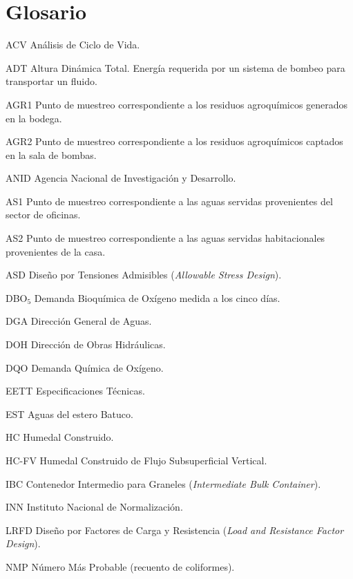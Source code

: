 \chapter*{Glosario}

\begin{glosario}
  \item[ACV] Análisis de Ciclo de Vida.
  \item[ADT] Altura Dinámica Total. Energía requerida por un sistema de bombeo para transportar un fluido.
  \item[AGR1] Punto de muestreo correspondiente a los residuos agroquímicos generados en la bodega.
  \item[AGR2] Punto de muestreo correspondiente a los residuos agroquímicos captados en la sala de bombas.
  \item[ANID] Agencia Nacional de Investigación y Desarrollo.
  \item[AS1] Punto de muestreo correspondiente a las aguas servidas provenientes del sector de oficinas.
  \item[AS2] Punto de muestreo correspondiente a las aguas servidas habitacionales provenientes de la casa.
  \item[ASD] Diseño por Tensiones Admisibles (\textit{Allowable Stress Design}).
  \item[DBO$_5$] Demanda Bioquímica de Oxígeno medida a los cinco días.
  \item[DGA] Dirección General de Aguas.
  \item[DOH] Dirección de Obras Hidráulicas.
  \item[DQO] Demanda Química de Oxígeno.
  \item[EETT] Especificaciones Técnicas.
  \item[EST] Aguas del estero Batuco.
  \item[HC] Humedal Construido.
  \item[HC-FV] Humedal Construido de Flujo Subsuperficial Vertical.
  \item[IBC] Contenedor Intermedio para Graneles (\textit{Intermediate Bulk Container}).
  \item[INN] Instituto Nacional de Normalización.
  \item[LRFD] Diseño por Factores de Carga y Resistencia (\textit{Load and Resistance Factor Design}).
  \item[NMP] Número Más Probable (recuento de coliformes).

\end{glosario}
